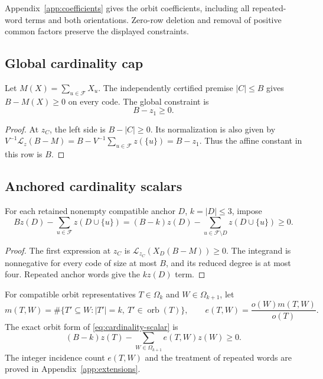 \documentclass[11pt]{article}
\newcommand{\F}{\mathcal F}
\newcommand{\Lz}{\mathcal L_z}
\newcommand{\Lzc}{\mathcal L_{z_C}}
\newcommand{\orb}{\operatorname{orb}}
\begin{document}
Appendix~\ref{app:coefficients} gives the orbit coefficients, including all
repeated-word terms and both orientations. Zero-row deletion and removal of
positive common factors preserve the displayed constraints.

\subsection{Global cardinality cap}\label{subsec:cap}

Let $M(X)=\sum_{u\in\F}X_u$. The independently certified premise
$|C|\le B$ gives $B-M(X)\ge0$ on every code. The global constraint is
\begin{equation}\label{eq:cap}
 B-z_1\ge0.
\end{equation}
\begin{proof}
At $z_C$, the left side is $B-|C|\ge0$. Its normalization is also given by
$V^{-1}\Lz(B-M)=B-V^{-1}\sum_{u\in\F}z(\{u\})=B-z_1$.
Thus the affine constant in this row is $B$.
\end{proof}

\subsection{Anchored cardinality scalars}\label{subsec:cardinality-scalar}

For each retained nonempty compatible anchor $D$, $k=|D|\le3$, impose
\begin{equation}\label{eq:cardinality-scalar}
 Bz(D)-\sum_{u\in\F}z(D\cup\{u\})
 =(B-k)z(D)-\sum_{u\in\F\setminus D}z(D\cup\{u\})\ge0.
\end{equation}
\begin{proof}
The first expression at $z_C$ is $\Lzc(X_D(B-M))\ge0$.
The integrand is nonnegative for every code of size at most $B$, and its
reduced degree is at most four. Repeated anchor words give the $kz(D)$ term.
\end{proof}

For compatible orbit representatives $T\in\Omega_k$ and
$W\in\Omega_{k+1}$, let
\begin{equation}\label{eq:extensions}
 m(T,W)=\#\{T'\subseteq W:|T'|=k,\ T'\in\orb(T)\},\qquad
 e(T,W)=\frac{o(W)m(T,W)}{o(T)}.
\end{equation}
The exact orbit form of \eqref{eq:cardinality-scalar} is
\begin{equation}\label{eq:cardinality-orbit}
 (B-k)z(T)-\sum_{W\in\Omega_{k+1}}e(T,W)z(W)\ge0.
\end{equation}
The integer incidence count $e(T,W)$ and the treatment of repeated words
are proved in Appendix~\ref{app:extensions}.
\end{document}
